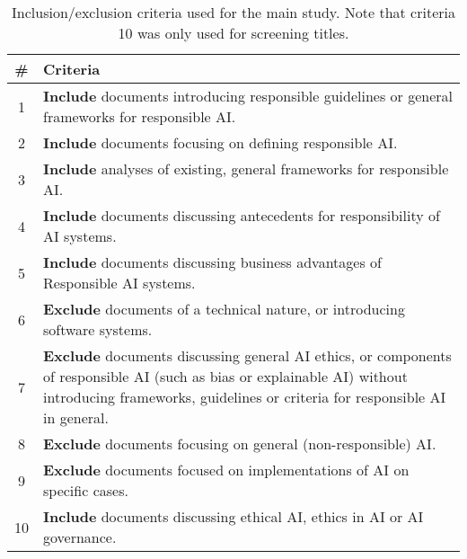 \begin{table}[htp]
    \centering
    \begin{tabular}{cp{}}
        \textbf{\#} & \textbf{Criteria} \\
        \hline
        1 & \textbf{Include} documents introducing responsible guidelines or general frameworks for responsible AI. \\
        2 & \textbf{Include} documents focusing on defining responsible AI. \\
        3 & \textbf{Include} analyses of existing, general frameworks for responsible AI. \\
        4 & \textbf{Include} documents discussing antecedents for responsibility of AI systems. \\
        5 & \textbf{Include} documents discussing business advantages of Responsible AI systems. \\
        \hline
        6 & \textbf{Exclude} documents of a technical nature, or introducing software systems. \\ %
        7 & \textbf{Exclude} documents discussing general AI ethics, or components of responsible AI (such as bias or explainable AI) without introducing frameworks, guidelines or criteria for responsible AI in general. \\
        8 & \textbf{Exclude} documents focusing on general (non-responsible) AI. \\ %
        9 & \textbf{Exclude} documents focused on implementations of AI on specific cases. \\ %
        \hline
        10 & \textbf{Include} documents discussing ethical AI, ethics in AI or AI governance. \\
    \end{tabular}
    \caption[Inclusion/exclusion criteria used for the main study]{Inclusion/exclusion criteria used for the main study. Note that criteria 10 was only used for screening titles.}
    \label{tab:criteria-main}
\end{table}
